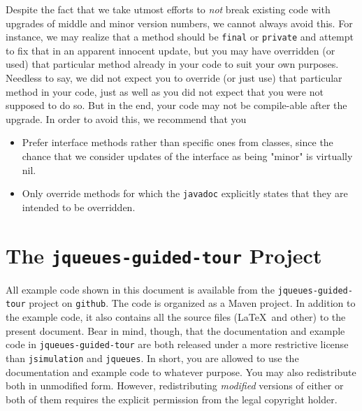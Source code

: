 Despite the fact that we take utmost efforts
  to {\em not\/} break existing code
  with upgrades of middle and minor version numbers,
  we cannot always avoid this.
For instance,
  we may realize that a method should be
  \lstinline|final| or \lstinline|private|
  and attempt to fix that in an apparent innocent update,
  but you may have overridden (or used)
  that particular method already in your code
  to suit your own purposes.
Needless to say,
  we did not expect you to override (or just use) that particular method in your code,
  just as well as you did not expect that you were not supposed to do so.
But in the end,
  your code may not be compile-able after the upgrade.
In order to avoid this, we recommend that you
\begin{itemize}
  \item Prefer interface methods rather than specific ones from classes,
        since the chance that we consider updates of the interface
        as being "minor" is virtually nil.
  \item Only override methods for which the \lstinline|javadoc| explicitly
        states that they are intended to be overridden.
\end{itemize}

\section{The \texttt{jqueues-guided-tour} Project}

All example code shown in this document is available
  from the \lstinline|jqueues-guided-tour|
  project on \lstinline|github|.
The code is organized as a Maven project.
In addition to the example code,
  it also contains all the source 
  files (\LaTeX\ and other)
  to the present document.
Bear in mind, though, that the documentation and
  example code in \lstinline|jqueues-guided-tour|
  are both released under a more restrictive license than
  \lstinline|jsimulation| and \lstinline|jqueues|.
In short, you are allowed to use the documentation and
  example code to whatever purpose.
You may also redistribute both in unmodified form.
However,
  redistributing {\em modified\/} versions
  of either or both of them
  requires the explicit permission from
  the legal copyright holder.